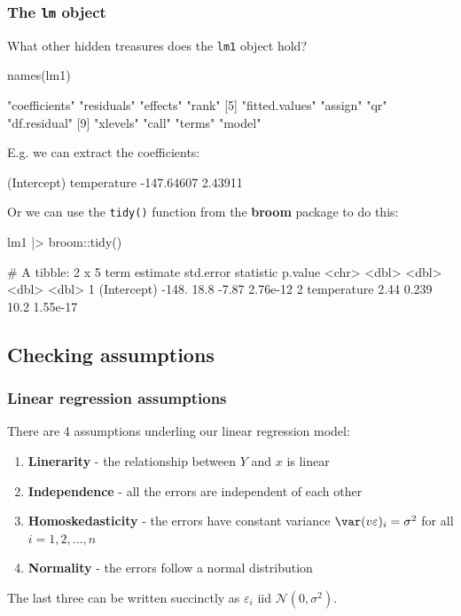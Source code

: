 \documentclass[a4paper]{article}
\begin{document}
\subsubsection{The \textcolor{myblue}{\lstinline|lm|} object}
What other hidden treasures does the \lstinline|lm1| object hold?
\begin{Schunk}
\begin{Sinput}
names(lm1)
\end{Sinput}
\begin{Soutput}
 [1] "coefficients"  "residuals"     "effects"       "rank"         
 [5] "fitted.values" "assign"        "qr"            "df.residual"  
 [9] "xlevels"       "call"          "terms"         "model"        
\end{Soutput}
\end{Schunk}
E.g. we can extract the coefficients:
\begin{Schunk}
\begin{Soutput}
(Intercept) temperature 
 -147.64607     2.43911 
\end{Soutput}
\end{Schunk}
Or we can use the \lstinline|tidy()| function from the \textbf{broom} package to do this:
\begin{Schunk}
\begin{Sinput}
lm1 |> broom::tidy()
\end{Sinput}
\begin{Soutput}
# A tibble: 2 x 5
  term        estimate std.error statistic  p.value
  <chr>          <dbl>     <dbl>     <dbl>    <dbl>
1 (Intercept)  -148.      18.8       -7.87 2.76e-12
2 temperature     2.44     0.239     10.2  1.55e-17
\end{Soutput}
\end{Schunk}
\subsection{Checking assumptions}
\subsubsection{Linear regression assumptions}
There are 4 assumptions underling our linear regression model:
\begin{enumerate}
	\item \textbf{Linerarity} - the relationship between \( Y \) and \( x \) is linear
	\item \textbf{Independence} -  all the errors are independent of each other
	\item \textbf{Homoskedasticity} - the errors have constant variance \( \var (v\varepsilon)_i = \sigma^2 \) for all \( i = 1,2, \dotsc, n \)
	\item \textbf{Normality} - the errors follow a normal distribution
\end{enumerate}
The last three can be written succinctly as \( \varepsilon_i \) iid \( \mathcal{N} (0,\sigma^2) \).
\end{document}
